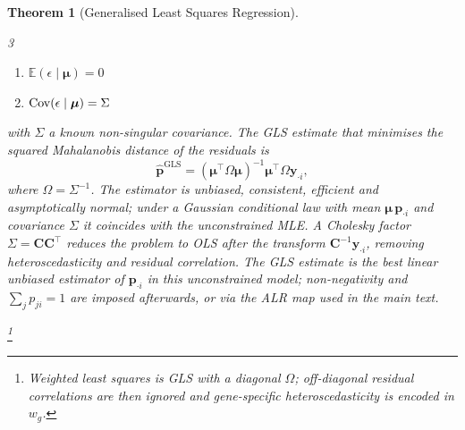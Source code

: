 \documentclass[pdflatex, sn-nature]{sn-jnl}
\theoremstyle{thmstyleone}%
\newtheorem{theorem}{Theorem}%
\theoremstyle{thmstyletwo}%
\theoremstyle{thmstylethree}%
\begin{document}
\begin{appendices}
\begin{theorem}[Generalised Least Squares Regression]
\begin{multicols}{3}
\begin{enumerate}
                    \item $\mathbb{E}(\epsilon\mid\boldsymbol{\mu})=0$

                    \item $\operatorname*{Cov}(\epsilon\mid\boldsymbol{\mu})=\Sigma$
                \end{enumerate}
            \end{multicols}
            with $\Sigma$ a known non-singular covariance. The GLS estimate
            that minimises the squared Mahalanobis distance of the residuals is
            \begin{equation*}
                \hat{\boldsymbol{p}}^{\mathrm{GLS}}
                =(\boldsymbol{\mu}^{\top}\Omega\boldsymbol{\mu})^{-1}
                \boldsymbol{\mu}^{\top}\Omega\boldsymbol{y}_{\cdot i},
            \end{equation*}
            where $\Omega=\Sigma^{-1}$. The estimator is unbiased, consistent,
            efficient and asymptotically normal; under a Gaussian conditional
            law with mean $\boldsymbol{\mu}\,\boldsymbol{p}_{\cdot i}$ and covariance
            $\Sigma$ it coincides with the unconstrained MLE. A Cholesky factor
            $\Sigma=\boldsymbol{C}\boldsymbol{C}^{\top}$ reduces the problem to OLS
            after the transform $\boldsymbol{C}^{-1}\boldsymbol{y}_{\cdot i}$, removing
            heteroscedasticity and residual correlation. The GLS estimate is
            the best linear unbiased estimator of $\boldsymbol{p}_{\cdot i}$ in
            this unconstrained model; non-negativity and
            $\sum_{j}p_{ji}=1$ are imposed afterwards, or via the ALR map
            used in the main text.

            \footnote{Weighted least squares is GLS with a diagonal
            $\Omega$; off-diagonal residual correlations are then ignored and
            gene-specific heteroscedasticity is encoded in $w_{g}$.}
        \end{theorem}
    \end{appendices}

    
\end{document}
